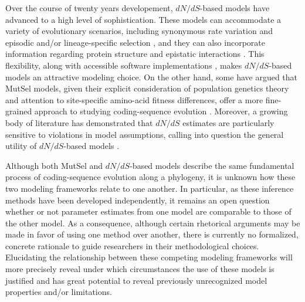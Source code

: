 \documentclass[11pt]{article}
\begin{document}
Over the course of twenty years developement, $dN/dS$-based models have advanced to a high level of sophistication. These models can accommodate a variety of evolutionary scenarios, including synonymous rate variation \cite{MuseGaut1994,KosakovskyPondMuse2005} and episodic \cite{KosakovskyPondetal2011,MEME} and/or lineage-specific selection \cite{YangNielsen2002,Zhangetal2005,KosakovskyPondFrost2005a}, and they can also incorporate information regarding protein structure and epistatic interactions \cite{Robinsonetal2003,Thorneetal2007,Rodrigueetal2009,Scherreretal2012,MeyerWilke2012}. This flexibility, along with accessible software implementations \cite{KosakovskyPondetal2005,Yang2007,Delport2010}, makes $dN/dS$-based models an attractive modeling choice. On the other hand, some have argued that MutSel models, given their explicit consideration of population genetics theory and attention to site-specific amino-acid fitness differences, offer a more fine-grained approach to studying coding-sequence evolution \cite{HalpernBruno1998,Rodrigueetal2010,Tamurietal2012,Thorne2012}. Moreover, a growing body of literature has demonstrated that $dN/dS$ estimates are particularly sensitive to violations in model assumptions, calling into question the general utility of $dN/dS$-based models \cite{Rochaetal2006,KryazhimskiyPlotkin2008,Mugaletal2014}.
		
Although both MutSel and $dN/dS$-based models describe the same fundamental process of coding-sequence evolution along a phylogeny, it is unknown how these two modeling frameworks relate to one another. In particular, as these inference methods have been developed independently, it remains an open question whether or not parameter estimates from one model are comparable to those of the other model. As a consequence, although certain rhetorical arguments may be made in favor of using one method over another, there is currently no formalized, concrete rationale to guide researchers in their methodological choices. Elucidating the relationship between these competing modeling frameworks will more precisely reveal under which circumstances the use of these models is justified and has great potential to reveal previously unrecognized model properties and/or limitations.
		
\end{document}
